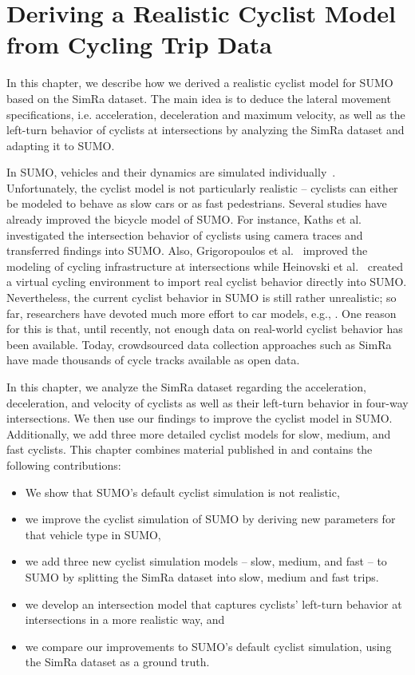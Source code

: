 \chapter{Deriving a Realistic Cyclist Model from Cycling Trip Data}
\label{cha:sumo}
In this chapter, we describe how we derived a realistic cyclist model for SUMO based on the SimRa dataset.
The main idea is to deduce the lateral movement specifications, i.e. acceleration, deceleration and maximum velocity, as well as the left-turn behavior of cyclists at intersections by analyzing the SimRa dataset and adapting it to SUMO.

In SUMO, vehicles and their dynamics are simulated individually~\cite{lopez2018microscopic}.
Unfortunately, the cyclist model is not particularly realistic -- cyclists can either be modeled to behave as slow cars or as fast pedestrians.
Several studies have already improved the bicycle model of SUMO.
For instance, Kaths et al.~\cite{kaths2016integration} investigated the intersection behavior of cyclists using camera traces and transferred findings into SUMO.
Also, Grigoropoulos et al.~\cite{grigoropoulos2019modelling} improved the modeling of cycling infrastructure at intersections while Heinovski et al.~\cite{heinovski2019modeling} created a virtual cycling environment to import real cyclist behavior directly into SUMO.
Nevertheless, the current cyclist behavior in SUMO is still rather unrealistic; so far, researchers have devoted much more effort to car models, e.g., \cite{chandler1958traffic,gazis1961nonlinear,gipps1981behavioural, leutzbach1986development,bando1995dynamical,krauss1998microscopic,treiber2000congested,salles2020extending}.
One reason for this is that, until recently, not enough data on real-world cyclist behavior has been available.
Today, crowdsourced data collection approaches such as SimRa have made thousands of cycle tracks available as open data.

In this chapter, we analyze the SimRa dataset regarding the acceleration, deceleration, and velocity of cyclists as well as their left-turn behavior in four-way intersections.
We then use our findings to improve the cyclist model in SUMO.
Additionally, we add three more detailed cyclist models for slow, medium, and fast cyclists.
This chapter combines material published in \cite{karakaya2022realistic,karakaya2023achieving} and contains the following contributions:
\begin{itemize}
    \item We show that SUMO's default cyclist simulation is not realistic,
    \item we improve the cyclist simulation of SUMO by deriving new parameters for that vehicle type in SUMO,
    \item we add three new cyclist simulation models -- slow, medium, and fast -- to SUMO by splitting the SimRa dataset into slow, medium and fast trips.
    \item we develop an intersection model that captures cyclists' left-turn behavior at intersections in a more realistic way, and
    \item we compare our improvements to SUMO's default cyclist simulation, using the SimRa dataset as a ground truth.
\end{itemize}

